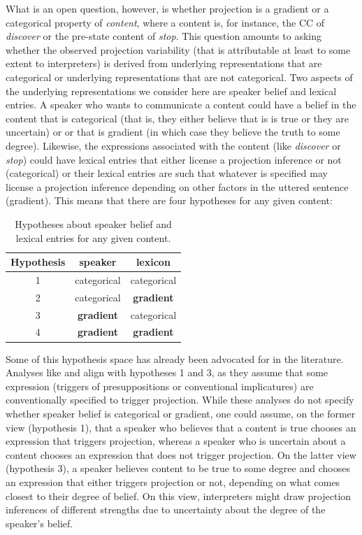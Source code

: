 \documentclass[11pt,fleqn]{article}
\newcommand{\6}{\mbox{$[\hspace*{-.6mm}[$}}
\newcommand{\9}{\mbox{$]\hspace*{-.6mm}]$}}
\begin{document}
What is an open question, however, is whether projection is a gradient or a categorical property of {\em content}, where a content is, for instance, the CC of {\em discover} or the pre-state content of {\em stop}. This question amounts to asking whether the observed projection variability (that is attributable at least to some extent to interpreters) is derived from underlying representations that are categorical or underlying representations that are not categorical. Two aspects of the underlying representations we consider here are speaker belief and lexical entries. A speaker who wants to communicate a content could have a belief in the content that is categorical (that is, they either believe that is is true or they are uncertain) or or that is gradient (in which case they believe the truth to some degree). Likewise, the expressions associated with the content (like {\em discover} or {\em stop}) could have lexical entries that either license a projection inference or not (categorical) or their lexical entries are such that whatever is specified may license a projection inference depending on other factors in the uttered sentence (gradient). This means that there are four hypotheses for any given content:

\begin{table}[h]
\centering
\begin{tabular}{c | c c}
Hypothesis & speaker & lexicon  \\ \hline\hline
1 & categorical & categorical  \\ 
2 & categorical & {\bf gradient}  \\ 
3 & {\bf gradient} & categorical \\ 
4 & {\bf gradient} & {\bf gradient}  \\ 
\hline
\end{tabular}
\caption{Hypotheses about speaker belief and lexical entries for any given content.}\label{t:hyp}
\end{table}

Some of this hypothesis space has already been advocated for in the literature. Analyses like \citealt{heim83,vds92} and \citealt{potts05} align with hypotheses 1 and 3, as they assume that some expression (triggers of presuppositions or conventional implicatures) are conventionally specified to trigger projection. While these analyses do not specify whether speaker belief is categorical or gradient, one could assume, on the former view (hypothesis 1), that a speaker who believes that a content is true chooses an expression that triggers projection, whereas a speaker who is uncertain about a content chooses an expression that does not trigger projection. On the latter view (hypothesis 3), a speaker believes content to be true to some degree and chooses an expression that either triggers projection or not, depending on what comes closest to their degree of belief. On this view, interpreters might draw projection inferences of different strengths due to uncertainty about the degree of the speaker's belief. 
\end{document}
